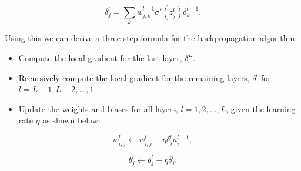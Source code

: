 \begin{equation}
    \label{eq:localgradient2}
    \delta_j^l = \sum_k w_{j,k}^{l+1}\sigma'(z_j^l)\delta_k^{l+1}.
\end{equation}

Using this we can derive a three-step formula for the backpropagation algorithm:
\begin{itemize}
    \item Compute the local gradient for the last layer, $\delta^L$.
    \item Recursively compute the local gradient for the remaining layers, $\delta^l$ for $l=L-1, L-2, ..., 1$.
    \item Update the weights and biases for all layers, $l=1, 2, ..., L$, given the learning rate $\eta$ as shown below: 
\end{itemize}

\begin{equation*}
    w_{i,j}^{l} \leftarrow w_{i,j}^{l} - \eta \delta_j^l a_i^{l-1},
\end{equation*}


\begin{equation*}
    b_j^l \leftarrow b_j^l - \eta \delta_j^l.
\end{equation*}
